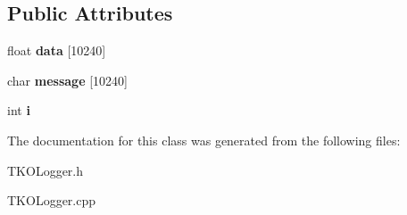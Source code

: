 \subsection*{\-Public \-Attributes}
\begin{DoxyCompactItemize}
\item 
\hypertarget{classTKOLogger_a6488bb61c82e31bf9abc4188fbb75cc2}{float {\bfseries data} \mbox{[}10240\mbox{]}}\label{classTKOLogger_a6488bb61c82e31bf9abc4188fbb75cc2}

\item 
\hypertarget{classTKOLogger_a1aaf7b5756aa9aa963e55f34529c58c5}{char {\bfseries message} \mbox{[}10240\mbox{]}}\label{classTKOLogger_a1aaf7b5756aa9aa963e55f34529c58c5}

\item 
\hypertarget{classTKOLogger_ac5315195c0c0ab695ab95a835aaa5def}{int {\bfseries i}}\label{classTKOLogger_ac5315195c0c0ab695ab95a835aaa5def}

\end{DoxyCompactItemize}


\-The documentation for this class was generated from the following files\-:\begin{DoxyCompactItemize}
\item 
\-T\-K\-O\-Logger.\-h\item 
\-T\-K\-O\-Logger.\-cpp\end{DoxyCompactItemize}
